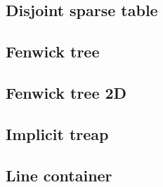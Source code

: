 \subsection{Disjoint sparse table}

\subsection{Fenwick tree}

\subsection{Fenwick tree 2D}

\subsection{Implicit treap}

\subsection{Line container}
